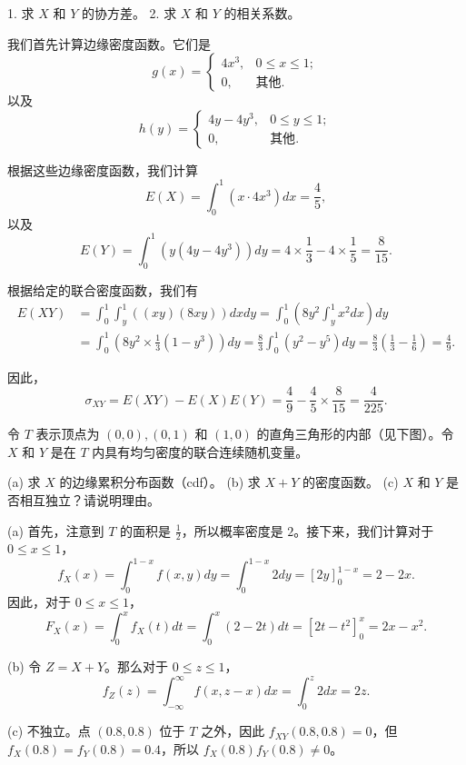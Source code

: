 \begin{questions}
1. 求 $X$ 和 $Y$ 的协方差。
2. 求 $X$ 和 $Y$ 的相关系数。

\begin{solution}
我们首先计算边缘密度函数。它们是
\[
g(x) = \begin{cases} 4x^3, & 0 \leq x \leq 1; \\ 0, & \text{其他}. \end{cases}
\]
以及
\[
h(y) = \begin{cases} 4y - 4y^3, & 0 \leq y \leq 1; \\ 0, & \text{其他}. \end{cases}
\]

根据这些边缘密度函数，我们计算
\[
E(X) = \int_0^1 (x \cdot 4x^3) dx = \frac{4}{5},
\]
以及
\[
E(Y) = \int_0^1 (y(4y - 4y^3)) dy = 4 \times \frac{1}{3} - 4 \times \frac{1}{5} = \frac{8}{15}.
\]

根据给定的联合密度函数，我们有
\begin{align*}
E(XY) &= \int_0^1 \int_y^1 ((xy)(8xy)) dx dy = \int_0^1 \left( 8y^2 \int_y^1 x^2 dx \right) dy \\
&= \int_0^1 \left( 8y^2 \times \frac{1}{3}(1 - y^3) \right) dy = \frac{8}{3} \int_0^1 (y^2 - y^5) dy = \frac{8}{3} \left( \frac{1}{3} - \frac{1}{6} \right) = \frac{4}{9}.
\end{align*}

因此，
\[
\sigma_{XY} = E(XY) - E(X)E(Y) = \frac{4}{9} - \frac{4}{5} \times \frac{8}{15} = \frac{4}{225}.
\]
\end{solution}

\question
令 $T$ 表示顶点为 $(0, 0), (0, 1)$ 和 $(1, 0)$ 的直角三角形的内部（见下图）。令 $X$ 和 $Y$ 是在 $T$ 内具有均匀密度的联合连续随机变量。

(a) 求 $X$ 的边缘累积分布函数（cdf）。
(b) 求 $X + Y$ 的密度函数。
(c) $X$ 和 $Y$ 是否相互独立？请说明理由。

\begin{solution}
(a) 首先，注意到 $T$ 的面积是 $\frac{1}{2}$，所以概率密度是 $2$。接下来，我们计算对于 $0 \le x \le 1$，
\[
f_X(x) = \int_0^{1-x} f(x, y)dy = \int_0^{1-x} 2dy = [2y]_0^{1-x} = 2 - 2x.
\]
因此，对于 $0 \le x \le 1$，
\[
F_X(x) = \int_0^x f_X(t)dt = \int_0^x (2 - 2t)dt = [2t - t^2]_0^x = 2x - x^2.
\]

(b) 令 $Z = X + Y$。那么对于 $0 \le z \le 1$，
\[
f_Z(z) = \int_{-\infty}^{\infty} f(x, z - x)dx = \int_0^z 2dx = 2z.
\]

(c) 不独立。点 $(0.8, 0.8)$ 位于 $T$ 之外，因此 $f_{XY}(0.8, 0.8) = 0$，但 $f_X(0.8) = f_Y(0.8) = 0.4$，所以 $f_X(0.8)f_Y(0.8) \neq 0$。
\end{solution}


\end{questions}

